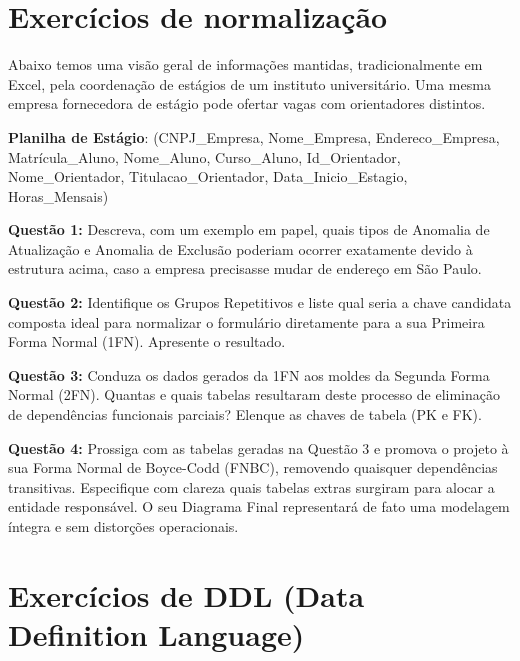 \section{Exercícios de normalização}
Abaixo temos uma visão geral de informações mantidas, tradicionalmente em Excel, pela coordenação de estágios de um instituto universitário. Uma mesma empresa fornecedora de estágio pode ofertar vagas com orientadores distintos.

\textbf{Planilha de Estágio}:
(CNPJ\_Empresa, Nome\_Empresa, Endereco\_Empresa, Matrícula\_Aluno, Nome\_Aluno, Curso\_Aluno, Id\_Orientador, Nome\_Orientador, Titulacao\_Orientador, Data\_Inicio\_Estagio, Horas\_Mensais)

\textbf{Questão 1:} Descreva, com um exemplo em papel, quais tipos de Anomalia de Atualização e Anomalia de Exclusão poderiam ocorrer exatamente devido à estrutura acima, caso a empresa precisasse mudar de endereço em São Paulo.

\textbf{Questão 2:} Identifique os Grupos Repetitivos e liste qual seria a chave candidata composta ideal para normalizar o formulário diretamente para a sua Primeira Forma Normal (1FN). Apresente o resultado.

\textbf{Questão 3:} Conduza os dados gerados da 1FN aos moldes da Segunda Forma Normal (2FN). Quantas e quais tabelas resultaram deste processo de eliminação de dependências funcionais parciais? Elenque as chaves de tabela (PK e FK).

\textbf{Questão 4:} Prossiga com as tabelas geradas na Questão 3 e promova o projeto à sua Forma Normal de Boyce-Codd (FNBC), removendo quaisquer dependências transitivas. Especifique com clareza quais tabelas extras surgiram para alocar a entidade responsável. O seu Diagrama Final representará de fato uma modelagem íntegra e sem distorções operacionais.

\section{Exercícios de DDL (Data Definition Language)}

